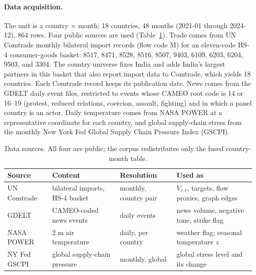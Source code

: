 \documentclass[10pt]{article}
\begin{document}
\paragraph{Data acquisition.}
The unit is a country $\times$ month: 18 countries, 48 months (2021-01 through 2024-12), 864 rows. Four public sources are used (Table~\ref{tab:sources}). Trade comes from UN Comtrade monthly bilateral import records (flow code M) for an eleven-code HS-4 consumer-goods basket: 8517, 8471, 8528, 8516, 8507, 9403, 6109, 6203, 6204, 9503, and 3304. The country universe fixes India and adds India's largest partners in this basket that also report import data to Comtrade, which yields 18 countries. Each Comtrade record keeps its publication date. News comes from the GDELT daily event files, restricted to events whose CAMEO root code is 14 or 16--19 (protest, reduced relations, coercion, assault, fighting) and in which a panel country is an actor. Daily temperature comes from NASA POWER at a representative coordinate for each country, and global supply-chain stress from the monthly New York Fed Global Supply Chain Pressure Index (GSCPI).

\begin{table}[t]
\centering
\caption{Data sources. All four are public; the corpus redistributes only the fused country-month table.}
\label{tab:sources}
\footnotesize
\begin{tabular}{l l l l}
\toprule
\textbf{Source} & \textbf{Content} & \textbf{Resolution} & \textbf{Used as} \\
\midrule
UN Comtrade & bilateral imports, HS-4 basket & monthly, country pair & $V_{v,t}$, targets, flow proxies, graph edges \\
GDELT & CAMEO-coded news events & daily events & news volume, negative tone, strike flag \\
NASA POWER & 2 m air temperature & daily, per country & weather flag; seasonal temperature $z$ \\
NY Fed GSCPI & global supply-chain pressure & monthly, global & global stress level and its change \\
\bottomrule
\end{tabular}
\end{table}
\end{document}
